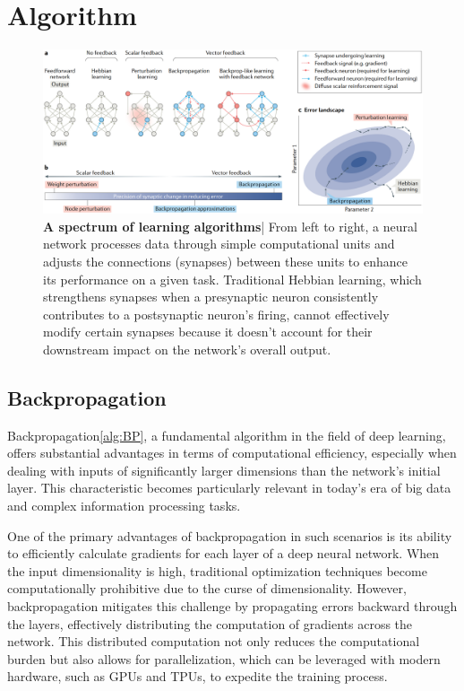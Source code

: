 \documentclass[nohyperref]{article}
\theoremstyle{plain}
\theoremstyle{definition}
\theoremstyle{remark}
\begin{document}
\section{Algorithm}
\begin{figure}[ht]
\vskip 0.2in
\begin{center}
\centerline{\includegraphics[width=2\columnwidth]{images/grad_landscape.png}}
\caption{\textbf{A spectrum of learning algorithms}| From left to right, a neural network processes data through simple computational units and adjusts the connections (synapses) between these units to enhance its performance on a given task. Traditional Hebbian learning, which strengthens synapses when a presynaptic neuron consistently contributes to a postsynaptic neuron's firing, cannot effectively modify certain synapses because it doesn't account for their downstream impact on the network's overall output.}
\label{grad_landscape}
\end{center}
\vskip -0.2in
\end{figure}

\subsection{Backpropagation}
Backpropagation\cref{alg:BP}, a fundamental algorithm in the field of deep learning, offers substantial advantages in terms of computational efficiency, especially when dealing with inputs of significantly larger dimensions than the network's initial layer. This characteristic becomes particularly relevant in today's era of big data and complex information processing tasks.

One of the primary advantages of backpropagation in such scenarios is its ability to efficiently calculate gradients for each layer of a deep neural network. When the input dimensionality is high, traditional optimization techniques become computationally prohibitive due to the curse of dimensionality. However, backpropagation mitigates this challenge by propagating errors backward through the layers, effectively distributing the computation of gradients across the network. This distributed computation not only reduces the computational burden but also allows for parallelization, which can be leveraged with modern hardware, such as GPUs and TPUs, to expedite the training process.
\end{document}
